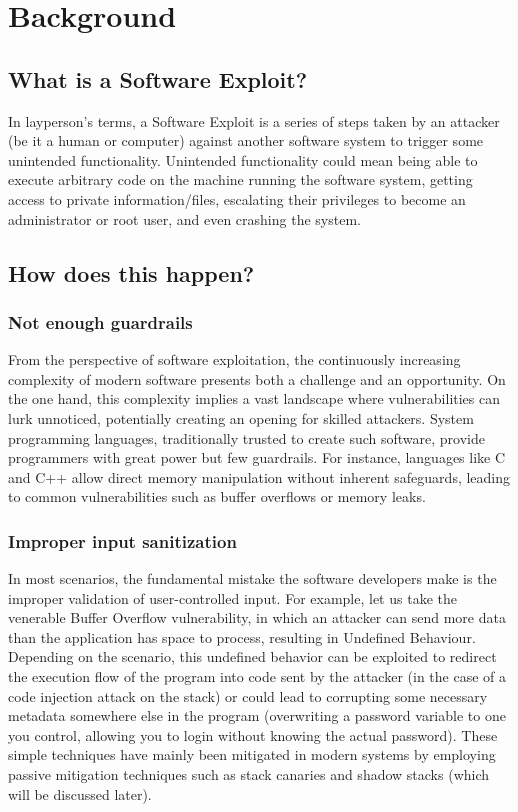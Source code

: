 \documentclass{article}
\begin{document}
\section{Background}%

\subsection{What is a Software Exploit?}%
In layperson's terms, a Software Exploit is a series of steps taken by an attacker (be it a human or computer) against another software system to trigger some unintended functionality. Unintended functionality could mean being able to execute arbitrary code on the machine running the software system, getting access to private information/files, escalating their privileges to become an administrator or root user, and even crashing the system.

\subsection{How does this happen?}%
\subsubsection{Not enough guardrails}%
From the perspective of software exploitation, the continuously increasing complexity of modern software presents both a challenge and an opportunity. On the one hand, this complexity implies a vast landscape where vulnerabilities can lurk unnoticed, potentially creating an opening for skilled attackers. System programming languages, traditionally trusted to create such software, provide programmers with great power but few guardrails. For instance, languages like C and C++ allow direct memory manipulation without inherent safeguards, leading to common vulnerabilities such as buffer overflows or memory leaks.


\subsubsection{Improper input sanitization}%
In most scenarios, the fundamental mistake the software developers make is the improper validation of user-controlled input. For example, let us take the venerable Buffer Overflow vulnerability, in which an attacker can send more data than the application has space to process, resulting in Undefined Behaviour. Depending on the scenario, this undefined behavior can be exploited to redirect the execution flow of the program into code sent by the attacker (in the case of a code injection attack on the stack) or could lead to corrupting some necessary metadata somewhere else in the program (overwriting a password variable to one you control, allowing you to login without knowing the actual password). These simple techniques have mainly been mitigated in modern systems by employing passive mitigation techniques such as stack canaries and shadow stacks (which will be discussed later).
\end{document}
